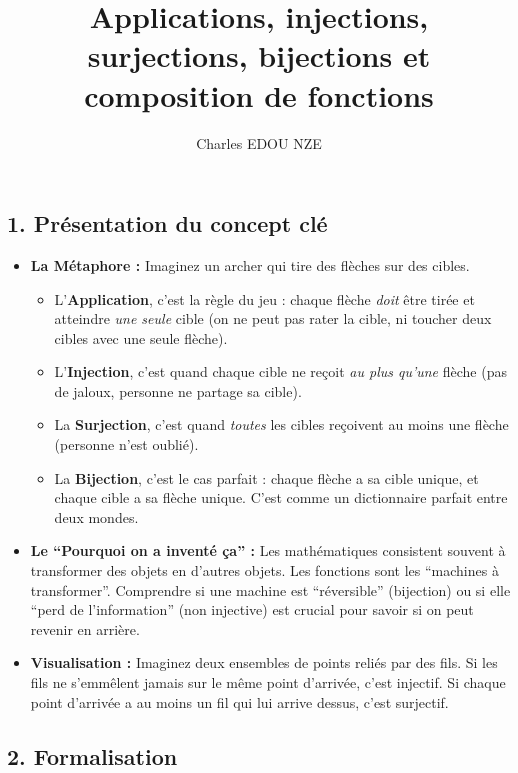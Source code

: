 \documentclass[12pt,a4paper]{report}
\title{Applications, injections, surjections, bijections et composition de fonctions}
\author{Charles EDOU NZE}
\date{}
\providecommand{\tightlist}{%
  \setlength{\itemsep}{0pt}\setlength{\parskip}{0pt}}
\begin{document}
\maketitle
\tableofcontents

\subsection{1. Présentation du concept
clé}\label{pruxe9sentation-du-concept-cluxe9}

\begin{itemize}
\tightlist
\item
  \textbf{La Métaphore :} Imaginez un archer qui tire des flèches sur
  des cibles.

  \begin{itemize}
  \tightlist
  \item
    L'\textbf{Application}, c'est la règle du jeu : chaque flèche
    \emph{doit} être tirée et atteindre \emph{une seule} cible (on ne
    peut pas rater la cible, ni toucher deux cibles avec une seule
    flèche).
  \item
    L'\textbf{Injection}, c'est quand chaque cible ne reçoit \emph{au
    plus qu'une} flèche (pas de jaloux, personne ne partage sa cible).
  \item
    La \textbf{Surjection}, c'est quand \emph{toutes} les cibles
    reçoivent au moins une flèche (personne n'est oublié).
  \item
    La \textbf{Bijection}, c'est le cas parfait : chaque flèche a sa
    cible unique, et chaque cible a sa flèche unique. C'est comme un
    dictionnaire parfait entre deux mondes.
  \end{itemize}
\item
  \textbf{Le ``Pourquoi on a inventé ça'' :} Les mathématiques
  consistent souvent à transformer des objets en d'autres objets. Les
  fonctions sont les ``machines à transformer''. Comprendre si une
  machine est ``réversible'' (bijection) ou si elle ``perd de
  l'information'' (non injective) est crucial pour savoir si on peut
  revenir en arrière.
\item
  \textbf{Visualisation :} Imaginez deux ensembles de points reliés par
  des fils. Si les fils ne s'emmêlent jamais sur le même point
  d'arrivée, c'est injectif. Si chaque point d'arrivée a au moins un fil
  qui lui arrive dessus, c'est surjectif.
\end{itemize}

\subsection{2. Formalisation}\label{formalisation}
\end{document}
